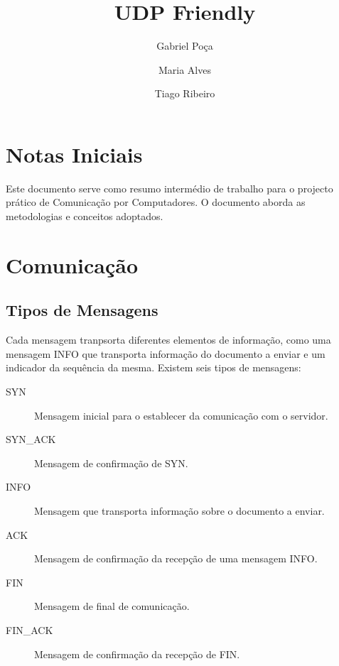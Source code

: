 \documentclass{llncs}
\begin{document}
\mainmatter
\title{UDP Friendly}


\author{Gabriel Poça \and Maria Alves \and Tiago Ribeiro}



\date{}


\maketitle

\section{Notas Iniciais}
Este documento serve como resumo intermédio de trabalho para o projecto prático de Comunicação por Computadores. O documento aborda as metodologias e conceitos adoptados.

\section{Comunicação}
\subsection{Tipos de Mensagens}
Cada mensagem tranpsorta diferentes elementos de informação, como uma mensagem INFO que transporta informação do documento a enviar e um indicador da sequência da mesma. Existem seis tipos de mensagens:
\begin{description}
	\item[SYN] Mensagem inicial para o establecer da comunicação com o servidor.
	\item[SYN\_ACK] Mensagem de confirmação de SYN.
	\item[INFO] Mensagem que transporta informação sobre o documento a enviar.
	\item[ACK] Mensagem de confirmação da recepção de uma mensagem INFO.
	\item[FIN] Mensagem de final de comunicação.
	\item[FIN\_ACK] Mensagem de confirmação da recepção de FIN.
\end{description}
\end{document}
